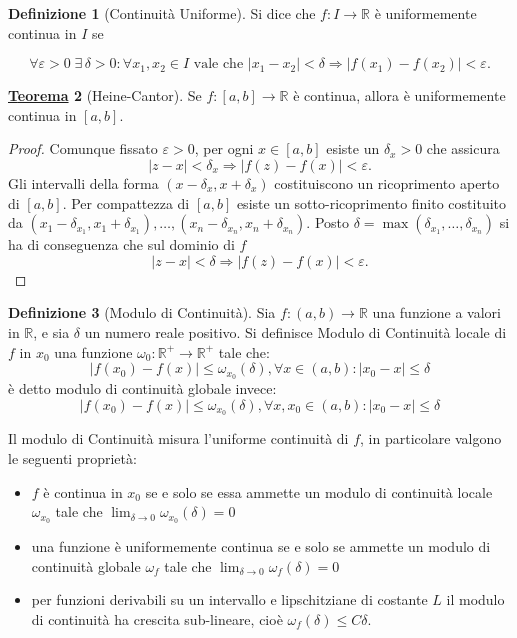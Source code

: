 \documentclass[a4paper,twoside]{article}
\renewcommand{\epsilon}{\varepsilon}
\newcommand{\R}{\mathbb{R}}
\theoremstyle{definition}
\newtheorem{theorem}{\color{Red}\underline{\textrm Teorema}}
\newtheorem{definizione}[theorem]{Definizione}
\numberwithin{theorem}{section}
\begin{document}
\begin{definizione}[Continuità Uniforme]
Si dice che $f:I\to\R$ è uniformemente continua in $I$ se 


$$\forall\epsilon>0\; \exists\,\delta>0: \forall x_1,x_2\in I\text{ vale che } |x_1-x_2|<\delta \Rightarrow |f(x_1)-f(x_2)|<\epsilon.$$
\end{definizione}

\begin{theorem}[Heine-Cantor]
Se $f:[a,b]\to\R$ è continua, allora è uniformemente continua in $[a,b]$.
\end{theorem}
\begin{proof}
Comunque fissato $\epsilon > 0$, per ogni $x\in[a,b]$ esiste un $\delta_x > 0$ che assicura $$|z-x|<\delta_x\Longrightarrow|f(z)-f(x)|<\epsilon.$$
Gli intervalli della forma $(x-\delta_x, x+\delta_x)$ costituiscono un ricoprimento aperto di $[a,b]$. Per compattezza di $[a,b]$ esiste un sotto-ricoprimento finito costituito da $(x_1-\delta_{x_1},x_1+\delta_{x_1}),\ldots,(x_n-\delta_{x_n},x_n+\delta_{x_n})$. Posto $\delta=\max(\delta_{x_1},\ldots,\delta_{x_n})$ si ha di conseguenza che sul dominio di $f$
$$|z-x|<\delta\Longrightarrow|f(z)-f(x)|<\epsilon.$$
\end{proof}


\begin{definizione}[Modulo di Continuità]
Sia $f:(a,b)\to\R$ una funzione a valori in $\R$, e sia $\delta$ un numero reale positivo. Si definisce Modulo di Continuità locale di $f$ in $x_0$ una funzione $\omega_0:\R^+\to\R^+$  tale che:\\
$$|f(x_0)-f(x)|\leq\omega_{x_0}(\delta),\forall x\in(a,b):|x_0-x|\leq\delta$$ è detto modulo di continuità globale invece:
$$|f(x_0)-f(x)|\leq\omega_{x_0}(\delta),\forall x,x_0\in(a,b):|x_0-x|\leq\delta$$
\end{definizione}



Il modulo di Continuità misura l'uniforme continuità di $f$, in particolare valgono le seguenti proprietà:
\begin{itemize}
 \item $f$ è continua in $x_0$ se e solo se essa ammette un modulo di continuità locale $\omega_{x_0}$ tale che $\lim_{\delta\to0}\omega_{x_0}(\delta)=0$
 \item una funzione è uniformemente continua se e solo se ammette un modulo di continuità globale $\omega_f$ tale che $\lim_{\delta\to 0}\omega_f(\delta)=0$
 \item per funzioni derivabili su un intervallo e lipschitziane di costante $L$ il modulo di continuità ha crescita sub-lineare, cioè $\omega_f(\delta)\leq C\delta$.
\end{itemize}
\end{document}
